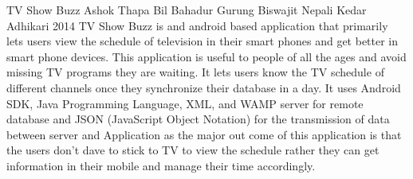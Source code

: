  \begin{conf-abstract}[]
{TV Show Buzz}
{Ashok Thapa
Bil Bahadur Gurung
Biswajit Nepali
Kedar Adhikari}
{2014}
TV Show Buzz is and android based application that primarily lets users view the schedule of television in their smart phones and get better in smart phone devices. This application is useful to people of all the ages and avoid missing TV programs they are waiting. It lets users know the TV schedule of different channels once they synchronize their database in a day. It uses Android SDK, Java Programming Language, XML, and WAMP server for remote database and JSON (JavaScript Object Notation) for the transmission of data between server and Application as the major out come of this application is that the users don't dave to stick to TV to view the schedule rather they can get information in their mobile and manage their time accordingly.
  \end{conf-abstract}
